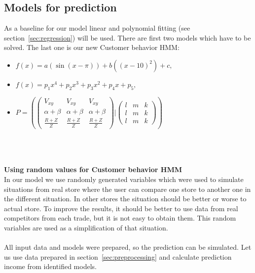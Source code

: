 \subsection{Models for prediction} \label{subsec:calculate_models}
As a baseline for our model linear and polynomial fitting (see section~\ref{sec:regression}) will be used.
There are first two models which have to be solved.
The last one is our new Customer behavior HMM:\\
\begin{itemize}
    \item $f(x) = a(\sin(x-\pi))+b((x-10)^2)+c,$
    \item $f(x) = p_1x^4 + p_2x^3 + p_3x^2 + p_4x + p_5,$\\
    \item $P = \left(
    \begin{pmatrix}
        V_{xy} & V_{xy} & V_{xy} \\
        \alpha + \beta & \alpha + \beta & \alpha + \beta \\
        \frac{R + Z}{Z} & \frac{R + Z}{Z} & \frac{R + Z}{Z}
    \end{pmatrix}|
    \begin{pmatrix}
        l & m & k \\
        l & m & k \\
        l & m & k
    \end{pmatrix}
    \right)$\\
    \\
\end{itemize}\\
\\
\textbf{Using random values for Customer behavior HMM}\\
In our model we use randomly generated variables which were used to simulate situations from real store where the user can compare one store to another one in the different situation.
In other stores the situation should be better or worse to actual store.
To improve the results, it should be better to use data from real competitors from each trade, but it is not easy to obtain them.
This random variables are used as a simplification of that situation.\\
\\
All input data and models were prepared, so the prediction can be simulated.
Let us use data prepared in section~\ref{sec:preprocessing} and calculate prediction income from identified models.
